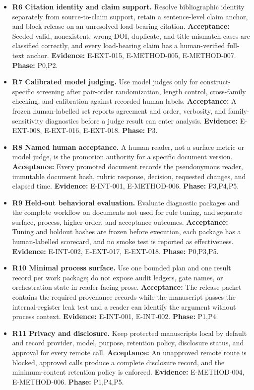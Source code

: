 \documentclass[11pt]{article}
\begin{document}
\begin{itemize}
\item
  \textbf{R6 Citation identity and claim support.} Resolve bibliographic identity separately from source-to-claim support, retain a sentence-level claim anchor, and block release on an unresolved load-bearing citation. \textbf{Acceptance:} Seeded valid, nonexistent, wrong-DOI, duplicate, and title-mismatch cases are classified correctly, and every load-bearing claim has a human-verified full-text anchor. \textbf{Evidence:} E-EXT-015, E-METHOD-005, E-METHOD-007. \textbf{Phase:} P0,P2.
\item
  \textbf{R7 Calibrated model judging.} Use model judges only for construct-specific screening after pair-order randomization, length control, cross-family checking, and calibration against recorded human labels. \textbf{Acceptance:} A frozen human-labelled set reports agreement and order, verbosity, and family-sensitivity diagnostics before a judge result can enter analysis. \textbf{Evidence:} E-EXT-008, E-EXT-016, E-EXT-018. \textbf{Phase:} P3.
\item
  \textbf{R8 Named human acceptance.} A human reader, not a surface metric or model judge, is the promotion authority for a specific document version. \textbf{Acceptance:} Every promoted document records the pseudonymous reader, immutable document hash, rubric response, decision, requested changes, and elapsed time. \textbf{Evidence:} E-INT-001, E-METHOD-006. \textbf{Phase:} P3,P4,P5.
\item
  \textbf{R9 Held-out behavioral evaluation.} Evaluate diagnostic packages and the complete workflow on documents not used for rule tuning, and separate surface, process, higher-order, and acceptance outcomes. \textbf{Acceptance:} Tuning and holdout hashes are frozen before execution, each package has a human-labelled scorecard, and no smoke test is reported as effectiveness. \textbf{Evidence:} E-INT-002, E-EXT-017, E-EXT-018. \textbf{Phase:} P0,P3,P5.
\item
  \textbf{R10 Minimal process surface.} Use one bounded plan and one result record per work package; do not expose audit ledgers, gate names, or orchestration state in reader-facing prose. \textbf{Acceptance:} The release packet contains the required provenance records while the manuscript passes the internal-register leak test and a reader can identify the argument without process context. \textbf{Evidence:} E-INT-001, E-INT-002. \textbf{Phase:} P1,P4.
\item
  \textbf{R11 Privacy and disclosure.} Keep protected manuscripts local by default and record provider, model, purpose, retention policy, disclosure status, and approval for every remote call. \textbf{Acceptance:} An unapproved remote route is blocked, approved calls produce a complete disclosure record, and the minimum-content retention policy is enforced. \textbf{Evidence:} E-METHOD-004, E-METHOD-006. \textbf{Phase:} P1,P4,P5.

\end{itemize}
\end{document}
